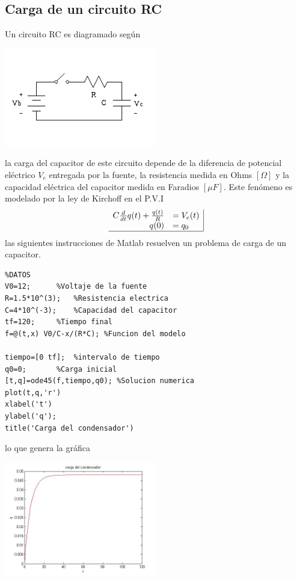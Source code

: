 \documentclass[11pt]{article}
\begin{document}
\subsection{Carga de un circuito RC}
Un circuito RC es diagramado seg\'un 
\begin{center}
\includegraphics[width=0.5\textwidth]{cap1.jpg}
\end{center}
la carga del capacitor de este circuito depende de la diferencia de potencial el\'ectrico $V_{e}$ entregada por la fuente, la resistencia medida en Ohms $[\Omega]$ y la capacidad el\'ectrica del capacitor medida en Faradios $[\mu F]$. Este fen\'omeno es modelado por la ley de Kirchoff en el P.V.I
$$
\begin{array}{rl|}
C \frac{d}{dt}q(t)+\frac{q(t)}{R}	& =V_{e}(t) 	\\
					q(0)	&=q_0		\\ \hline
\end{array}
$$
las siguientes instrucciones de Matlab resuelven un problema de carga de un capacitor.
\begin{lstlisting}
%DATOS
V0=12;		%Voltaje de la fuente
R=1.5*10^(3);	%Resistencia electrica
C=4*10^(-3); 	%Capacidad del capacitor
tf=120;		%Tiempo final 
f=@(t,x) V0/C-x/(R*C); %Funcion del modelo

tiempo=[0 tf]; 	%intervalo de tiempo
q0=0;		%Carga inicial
[t,q]=ode45(f,tiempo,q0); %Solucion numerica
plot(t,q,'r')
xlabel('t')
ylabel('q');
title('Carga del condensador')
\end{lstlisting}
lo que genera la gr\'afica
\begin{center}
\includegraphics[width=0.5\textwidth]{eje1.jpg}
\end{center}
\end{document}
